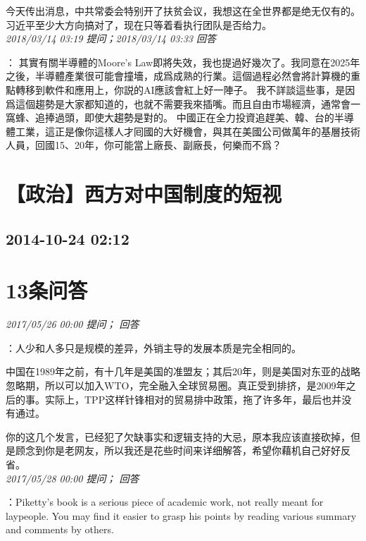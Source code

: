 \documentclass[twocolumn]{ctexart}
\begin{document}
今天传出消息，中共常委会特别开了扶贫会议，我想这在全世界都是绝无仅有的。习近平至少大方向搞对了，现在只等着看执行团队是否给力。\\

\textit{\hfill\noindent\small 2018/03/14 03:19 提问；2018/03/14 03:33 回答}

：
其實有關半導體的Moore’s Law即將失效，我也提過好幾次了。我同意在2025年之後，半導體產業很可能會撞墻，成爲成熟的行業。這個過程必然會將計算機的重點轉移到軟件和應用上，你説的AI應該會紅上好一陣子。
我不詳談這些事，是因爲這個趨勢是大家都知道的，也就不需要我來插嘴。而且自由市場經濟，通常會一窩蜂、追捧過頭，即使大趨勢是對的。
中國正在全力投資追趕美、韓、台的半導體工業，這正是像你這樣人才囘國的大好機會，與其在美國公司做萬年的基層技術人員，回國15、20年，你可能當上廠長、副廠長，何樂而不爲？
\\


\section{【政治】西方对中国制度的短视}
\subsection{2014-10-24 02:12}


\section{13条问答}

\textit{\hfill\noindent\small 2017/05/26 00:00 提问； 回答}

：人少和人多只是规模的差异，外销主导的发展本质是完全相同的。

中国在1989年之前，有十几年是美国的准盟友；其后20年，则是美国对东亚的战略忽略期，所以可以加入WTO，完全融入全球贸易圈。真正受到排挤，是2009年之后的事。实际上，TPP这样针锋相对的贸易排中政策，拖了许多年，最后也并没有通过。

你的这几个发言，已经犯了欠缺事实和逻辑支持的大忌，原本我应该直接砍掉，但是顾念到你是老网友，所以我还是花些时间来详细解答，希望你藉机自己好好反省。\\

\textit{\hfill\noindent\small 2017/05/28 00:00 提问； 回答}

：Piketty's book is a serious piece of academic work, not really meant for laypeople. You may find it easier to grasp his points by reading various summary and comments by others.\\
\end{document}
